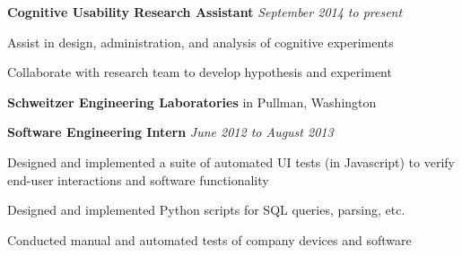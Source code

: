 \documentclass[12pt]{article}
\newcommand{\gdotfill}{\textcolor{lightgray}{\dotfill}}
\newenvironment{innerlist}[1][\enskip\textbullet]%
        {\begin{compactitem}[#1]}{\end{compactitem}}
\begin{document}
	\smallskip
	
	\begin{innerlist}
		\item[] \textbf{Cognitive Usability Research Assistant}
		\gdotfill \textit{September 2014 to present}
		\begin{innerlist}
			\item {Assist in design, administration, and analysis of cognitive experiments}
			\item {Collaborate with research team to develop hypothesis and experiment}
		\end{innerlist}
		
	\end{innerlist}
	
	\medskip
	
	\textbf{Schweitzer Engineering Laboratories} in Pullman, Washington
	
	\smallskip
	
	\begin{innerlist}
		\item[] \textbf{Software Engineering Intern}
		\gdotfill \textit{June 2012 to August 2013}
		\begin{innerlist}
			\item {Designed and implemented a suite of automated UI tests (in Javascript) to verify end-user interactions and software functionality}
			\item {Designed and implemented Python scripts for SQL queries, parsing, etc.}
			\item {Conducted manual and automated tests of company devices and software}
		\end{innerlist}
	\end{innerlist}
	
	
	

	
	\bigskip
		
\end{document}

